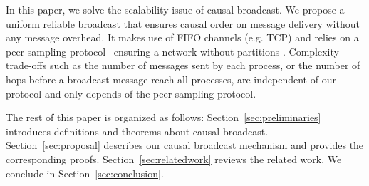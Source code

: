 In this paper, we solve the scalability issue of causal broadcast. We propose a
uniform reliable broadcast that ensures causal order on message delivery without
any message overhead.  It makes use of FIFO channels (e.g. TCP) and relies on a
peer-sampling protocol~\cite{jelasity2007gossip} ensuring a network without
partitions .
Complexity trade-offs such as the number of messages sent by each process, or
the number of hops before a broadcast message reach all processes, are
independent of our protocol and only depends of the peer-sampling protocol.

The rest of this paper is organized as follows: Section~\ref{sec:preliminaries}
introduces definitions and theorems about causal
broadcast. Section~\ref{sec:proposal} describes our causal broadcast mechanism
and provides the corresponding proofs. Section~\ref{sec:relatedwork} reviews the
related work. We conclude in Section~\ref{sec:conclusion}.




